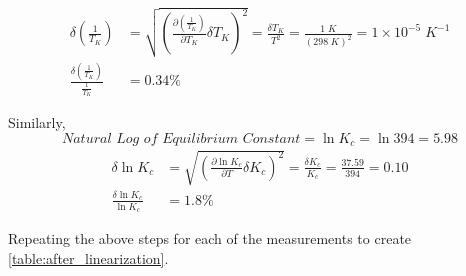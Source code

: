 \begin{align}
    \delta \left(\frac{1}{T_K}\right) &= \sqrt{\left(\frac{\partial \left(\frac{1}{T_K}\right)}{\partial T_K} \delta T_K \right)^2} = \frac{\delta T_K}{T^2} = \frac{1 \; K}{(298 \; K)^2} = 1 \times 10^{-5} \; K^{-1} \\
    \frac{\delta \left(\frac{1}{T_K}\right)}{\frac{1}{T_K}} &= 0.34\%
\end{align}

\noindent
Similarly,
\begin{equation}
    \textit{Natural Log of Equilibrium Constant} = \ln K_c = \ln 394 = 5.98
\end{equation}
\begin{align}
    \delta \ln K_c &= \sqrt{\left(\frac{\partial \ln K_c}{\partial T}\delta K_c \right)^2} = \frac{\delta K_c}{K_c} = \frac{37.59}{394} = 0.10 \\
    \frac{\delta \ln K_c}{\ln K_c} &= 1.8\%
\end{align}

\noindent
Repeating the above steps for each of the measurements to create \cref{table:after_linearization}.


